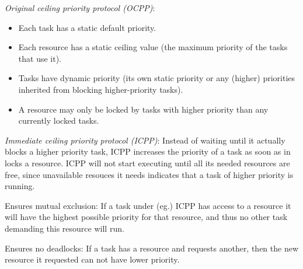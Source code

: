 \textit{Original ceiling priority protocol (OCPP)}:
\begin{itemize}
  \item Each task has a static default priority.
  \item Each resource has a static ceiling value (the maximum priority of the tasks that use it).
  \item Tasks have dynamic priority (its own static priority or any (higher) priorities inherited from blocking higher-priority tasks).
  \item A resource may only be locked by tasks with higher priority than any currently locked tasks.
\end{itemize}

\textit{Immediate ceiling priority protocol (ICPP)}:
Instead of waiting until it actually blocks a higher priority task, ICPP increases the priority of a task as soon as in locks a resource. ICPP will not start executing until all its needed resources are free, since unavailable resouces it needs indicates that a task of higher priority is running.

Ensures mutual exclusion: If a task under (eg.) ICPP has access to a resource it will have the highest possible priority for that resource, and thus no other task demanding this resource will run.

Ensures no deadlocks: If a task has a resource and requests another, then the new resource it requested can not have lower priority.

